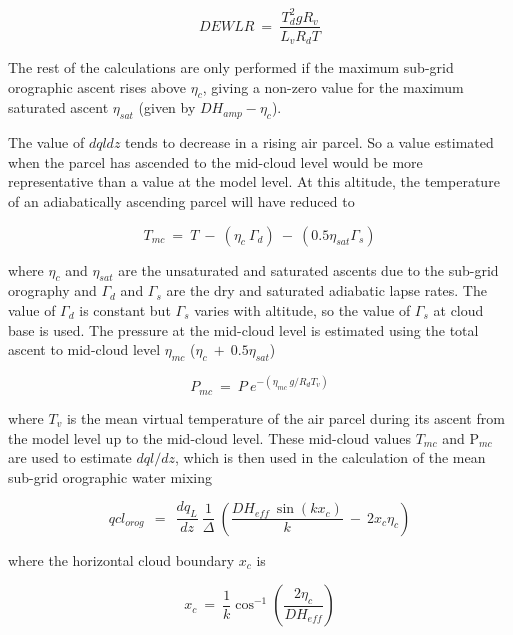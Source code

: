 \documentclass{UMDP_article}
\begin{document}
\begin{equation} 
DEWLR ~=~ \frac{T_d^2 g R_v}{L_v R_d T}
\end{equation}

The rest of the calculations are only performed if the maximum sub-grid orographic ascent rises above $\eta_c$, giving a non-zero value for the maximum saturated ascent $\eta_{sat}$  
(given by $D H_{amp} - \eta_c$).  

The value of $dqldz$ tends to decrease in a rising air parcel.  So a value estimated when 
the parcel has ascended to the mid-cloud level would be more representative than a value at the model level.  At this altitude, the temperature of an adiabatically ascending parcel 
will have reduced to

\begin{equation} 
T_{mc} ~=~  T ~-~ (\eta_c ~ \Gamma_d)  ~-~ (0.5 \eta_{sat} \Gamma_s)
\end{equation}

where $\eta_c$ and $\eta_{sat}$ are the unsaturated and saturated ascents due to the sub-grid orography and  $\Gamma_d$ and $\Gamma_s$ are the dry and saturated adiabatic lapse rates.  The value of $\Gamma_d$ is constant but $\Gamma_s$ varies with altitude, so the value of $\Gamma_s$ at cloud base is used.  The pressure at the mid-cloud level is estimated using the total ascent to mid-cloud level $\eta_{mc}$ ($\eta_c~+~ 0.5 \eta_{sat}$)

\begin{equation} 
P_{mc} ~=~ P~ e^{ -( \eta_{mc} ~g / R_d T_v ) }
\end{equation}

where $T_v$ is the mean virtual temperature of the air parcel during its ascent from the model level up to the mid-cloud level. These mid-cloud values $T_{mc}$ and P$_{mc}$ are used to estimate $dql/dz$, which is then used in the calculation of the mean sub-grid orographic water mixing

\begin{equation} 
qcl_{orog} ~~=~~   \frac{dq_{L}}{dz}~ \frac{1}{\Delta}~ \left ( 
\frac{D H_{eff} ~\sin(k x_c)}{k}  ~-~  2 x_c \eta_c 
 \right ) 
\end{equation}

where the horizontal cloud boundary $x_c$ is 

\begin{equation}
x_c ~=~ \frac{1}{k} \cos^{-1} \left ( \frac{2 \eta_c}{ D H_{eff}} \right ) 
\end{equation}
\end{document}
